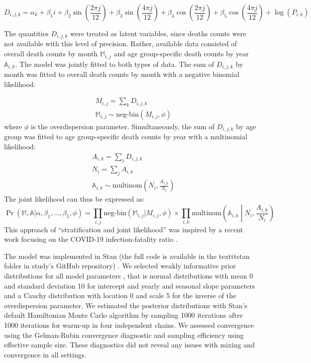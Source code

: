 \documentclass{article}
\begin{document}
	\begin{equation}
		D_{i,j,k} = \alpha_k + 
		\beta_1 i + 
		\beta_2 \sin\left(\frac{2\pi j}{12}\right) + 
		\beta_3 \sin\left(\frac{4\pi j}{12}\right) + 
		\beta_4 \cos\left(\frac{2\pi j}{12}\right) + 
		\beta_5 \cos\left(\frac{4\pi j}{12}\right) + 
		\log(P_{i,k})
	\end{equation}
	
	
	The quantities $D_{i,j,k}$ were treated as latent variables, since deaths counts were not available with this level of precision. Rather, available data consisted of overall death counts by month $\mathds{M}_{i,j}$ and age group-specific death counts by year $\mathds{A}_{i,k}$. The model was jointly fitted to both types of data.  The sum of $D_{i,j,k}$ by month was fitted to overall death counts by month with a negative binomial likelihood:
	
	\begin{align}
		&M_{i,j} = \sum_k D_{i,j,k} \\
		&\mathds{M}_{i,j} \sim \text{neg-bin}\left(M_{i,j},\phi\right)
	\end{align}
	where $\phi$ is the overdispersion parameter.
	Simultaneously, the sum of $D_{i,j,k}$ by age group was fitted to age group-specific death counts by year with a multinomial likelihood:
	\begin{align}
		&A_{i,k} = \sum_j D_{i,j,k} \\
		&N_i = \sum_j A_{i,k} \\
		&\mathds{A}_{i,k} \sim \text{multinom}\left(N_i, \frac{A_{i,k}}{N_i}\right)
	\end{align}
	The joint likelihood can thus be expressed as:
	\begin{equation}
		\Pr(\mathds{M},\mathds{A} | \alpha, \beta_1, \ldots, \beta_5,\phi) = \prod_{i,j} \text{neg-bin}\left(\mathds{M}_{i,j} | M_{i,j},\phi\right) \times \prod_{i,k} \text{multinom}\left(\mathds{A}_{i,k} \middle| N_i, \frac{A_{i,k}}{N_i}\right)
	\end{equation}
	This approach of ``stratification and joint likelihood'' was inspired by a recent work focusing on the COVID-19 infection-fatality ratio \cite{hauser2020}.
	
	The model was implemented in Stan (the full code is available in the texttt{stan} folder in study's GitHub repository) \cite{carpenter2017}. We selected weakly informative prior distributions for all model parameters \cite{gelman2020regression,gelman2008weakly}, that is normal distributions with mean 0 and standard deviation 10 for intercept and yearly and seasonal slope parameters and a Cauchy distribution with location 0 and scale 5 for the inverse of the overdispersion parameter. We estimated the posterior distributions with Stan's default Hamiltonian Monte Carlo algorithm \cite{hoffman2014no} by sampling 1000 iterations after 1000 iterations for warm-up in four independent chains. We assessed convergence using the Gelman-Rubin convergence diagnostic and sampling efficiency using effective sample size. These diagnostics did not reveal any issues with mixing and convergence in all settings.
	
\end{document}
